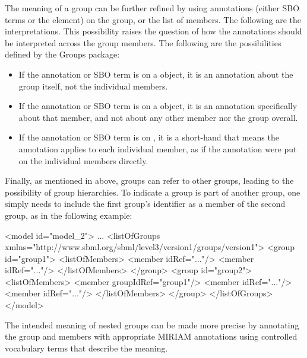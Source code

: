 The meaning of a group can be further refined by using annotations (either SBO terms or the \Annotation element) on the group, or the list of members. The following are the interpretations.  This possibility raises the question of how the annotations should be interpreted across the group members.  The following are the possibilities defined by the Groups package:

\begin{itemize}

\item If the annotation or SBO term is on a \Group object, it is an annotation about the group itself, not the individual members.

\item If the annotation or SBO term is on a \Member object, it is an annotation specifically about that member, and not about any other member nor the group overall.

\item If the annotation or SBO term is on \ListOfMembers, it is a short-hand that means the annotation applies to each individual member, as if the annotation were put on the individual members directly.

\end{itemize}

Finally, as mentioned in  above, groups can refer to other groups, leading to the possibility of group hierarchies. To indicate a group is part of another group, one simply needs to include the first group's identifier as a member of the second group, as in the following example:

\clearpage

\begin{example}
<model id="model_2"> 
  ... 
  <listOfGroups xmlns="http://www.sbml.org/sbml/level3/version1/groups/version1"> 
    <group id="group1"> 
      <listOfMembers> 
        <member idRef="..."/> 
        <member idRef="..."/> 
      </listOfMembers> 
    </group> 
    <group id="group2"> 
      <listOfMembers> 
        <member groupIdRef="group1"/> 
        <member idRef="..."/> 
        <member idRef="..."/> 
      </listOfMembers> 
    </group> 
  </listOfGroups> 
</model> 
\end{example}

The intended meaning of nested groups can be made more precise by annotating the group and members with appropriate MIRIAM annotations using controlled vocabulary terms that describe the meaning.


